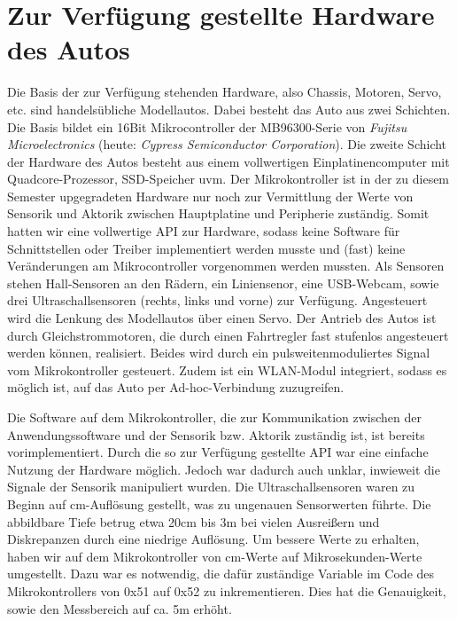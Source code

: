 \section{Zur Verfügung gestellte Hardware des Autos}
\label{sec:grundlegendesHW}

Die Basis der zur Verfügung stehenden Hardware, also Chassis, Motoren, Servo, etc. sind handelsübliche Modellautos. Dabei besteht das Auto aus zwei Schichten. Die Basis bildet ein 16Bit Mikrocontroller der MB96300-Serie von \textit{Fujitsu Microelectronics} (heute: \textit{Cypress Semiconductor Corporation}). Die zweite Schicht der Hardware des Autos besteht aus einem vollwertigen Einplatinencomputer mit Quadcore-Prozessor, SSD-Speicher uvm. Der Mikrokontroller ist in der zu diesem Semester upgegradeten Hardware nur noch zur Vermittlung der Werte von Sensorik und Aktorik zwischen Hauptplatine und Peripherie zuständig. Somit hatten wir eine vollwertige API zur Hardware, sodass keine Software für Schnittstellen oder Treiber implementiert werden musste und (fast) keine Veränderungen am Mikrocontroller vorgenommen werden mussten. Als Sensoren stehen Hall-Sensoren an den Rädern, ein Liniensenor, eine USB-Webcam, sowie drei Ultraschallsensoren (rechts, links und vorne) zur Verfügung. Angesteuert wird die Lenkung des Modellautos über einen Servo. Der Antrieb des Autos ist durch Gleichstrommotoren, die durch einen Fahrtregler fast stufenlos angesteuert werden können, realisiert. Beides wird durch ein pulsweitenmoduliertes Signal vom Mikrokontroller gesteuert. Zudem ist ein WLAN-Modul integriert, sodass es möglich ist, auf das Auto per Ad-hoc-Verbindung zuzugreifen. 

Die Software auf dem Mikrokontroller, die zur Kommunikation zwischen der Anwendungssoftware und der Sensorik bzw. Aktorik zuständig ist, ist bereits vorimplementiert. Durch die so zur Verfügung gestellte API war eine einfache Nutzung der Hardware möglich. Jedoch war dadurch auch unklar, inwieweit die Signale der Sensorik manipuliert wurden. Die Ultraschallsensoren waren zu Beginn auf cm-Auflösung gestellt, was zu ungenauen Sensorwerten führte. Die abbildbare Tiefe betrug etwa 20cm bis 3m bei vielen Ausreißern und Diskrepanzen durch eine niedrige Auflösung. Um bessere Werte zu erhalten, haben wir auf dem Mikrokontroller von cm-Werte auf Mikrosekunden-Werte umgestellt. Dazu war es notwendig, die dafür zuständige Variable im Code des Mikrokontrollers von 0x51 auf 0x52 zu inkrementieren. Dies hat die Genauigkeit, sowie den Messbereich auf ca. 5m erhöht.